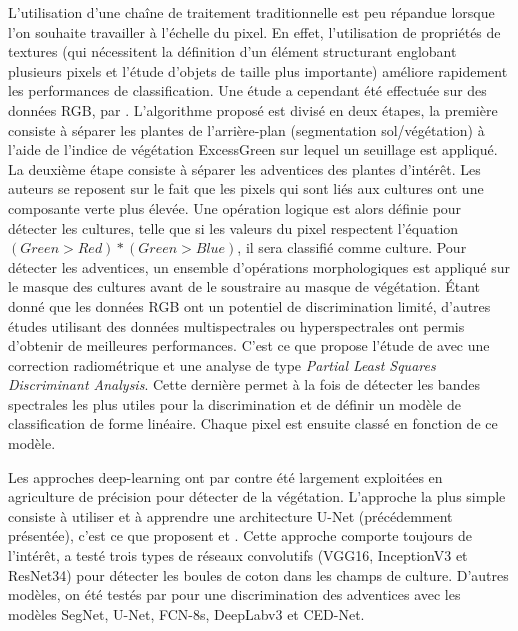 \documentclass[../thesis.tex]{subfiles}
\begin{document}
    L'utilisation d'une chaîne de traitement traditionnelle est peu répandue lorsque l'on souhaite travailler à l'échelle du pixel. En effet, l'utilisation de propriétés de textures (qui nécessitent la définition d'un élément structurant englobant plusieurs pixels et l'étude d'objets de taille plus importante) améliore rapidement les performances de classification. Une étude a cependant été effectuée sur des données RGB, par \cite{Sabeenian2010}. L'algorithme proposé est divisé en deux étapes, la première consiste à séparer les plantes de l'arrière-plan (segmentation sol/végétation) à l'aide de l'indice de végétation ExcessGreen sur lequel un seuillage est appliqué. La deuxième étape consiste à séparer les adventices des plantes d'intérêt. Les auteurs se reposent sur le fait que les pixels qui sont liés aux cultures ont une composante verte plus élevée. Une opération logique est alors définie pour détecter les cultures, telle que si les valeurs du pixel respectent l'équation $(Green > Red) * (Green > Blue)$, il sera classifié comme culture. Pour détecter les adventices, un ensemble d'opérations morphologiques est appliqué sur le masque des cultures avant de le soustraire au masque de végétation. Étant donné que les données RGB ont un potentiel de discrimination limité, d'autres études utilisant des données multispectrales \cite{zwiggelaar1998review} ou hyperspectrales ont permis d'obtenir de meilleures performances. C'est ce que propose l'étude de \cite{Herrmann2013} avec une correction radiométrique et une analyse de type \textit{Partial Least Squares Discriminant Analysis}. Cette dernière permet à la fois de détecter les bandes spectrales les plus utiles pour la discrimination et de définir un modèle de classification de forme linéaire. Chaque pixel est ensuite classé en fonction de ce modèle.
    
    Les approches deep-learning ont par contre été largement exploitées en agriculture de précision pour détecter de la végétation. L'approche la plus simple consiste à utiliser et à apprendre une architecture U-Net (précédemment présentée), c'est ce que proposent \cite{ma2019fully, brilhador2019classification} et \cite{Fawakherji2019}. Cette approche comporte toujours de l'intérêt, \cite{SINGH2022100045} a testé trois types de réseaux convolutifs (VGG16, InceptionV3 et ResNet34) pour détecter les boules de coton dans les champs de culture. D'autres modèles, on été testés par \cite{khan2020ced} pour une discrimination des adventices avec les modèles SegNet, U-Net, FCN-8s, DeepLabv3 et CED-Net.
    
\end{document}
